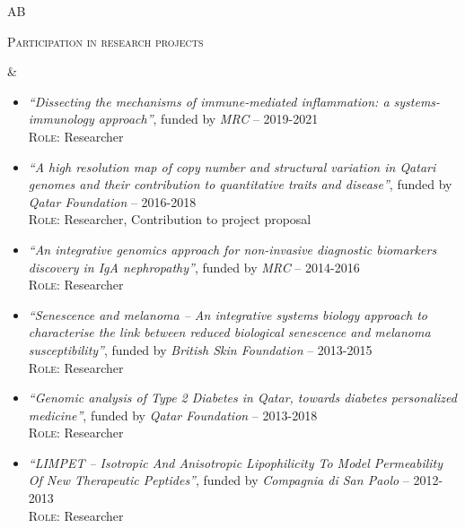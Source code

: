 \documentclass[a4paper,10pt]{article}
\newenvironment{doubletablelist}
{
	\vspace{-0.2cm}
	\begin{longtable}[!h]{AB}}{\end{longtable}
}
\newcommand{\dtlist}[2]{
\hspace{-3cm}
\noindent
	\begin{minipage}{0.24\textwidth}
	\begin{flushright}
	\textsc{#1}
	\end{flushright}
	\end{minipage}
	& #2\\[0.2cm]
}
\newcommand{\minusitem}{\item[-]}
\begin{document}
\begin{doubletablelist}
\dtlist{Participation in research projects}{
	\vspace{-0.8cm}
	\begin{itemize} %
		\minusitem  \begin{minipage}{0.65\textwidth}
			\emph{``Dissecting the mechanisms of immune-mediated inflammation: a systems-immunology approach''}, funded by \emph{MRC} -- 2019-2021\\
			\textsc{Role:} Researcher
		\end{minipage}
		
		\minusitem  \begin{minipage}{0.65\textwidth}
			\emph{``A high resolution map of copy number and structural variation in Qatari genomes and their contribution to quantitative traits and disease''}, funded by \emph{Qatar Foundation} -- 2016-2018\\
			\textsc{Role:} Researcher, Contribution to project proposal
		\end{minipage}
		
		\minusitem  \begin{minipage}{0.65\textwidth}
			\emph{``An integrative genomics approach for non-invasive diagnostic biomarkers discovery in IgA nephropathy''}, funded by \emph{MRC} -- 2014-2016\\
			\textsc{Role:} Researcher
		\end{minipage}
		
		\minusitem  \begin{minipage}{0.65\textwidth}
			\emph{``Senescence and melanoma -- An integrative systems biology approach to characterise the link between reduced biological senescence and melanoma susceptibility''}, funded by \emph{British Skin Foundation} -- 2013-2015\\
			\textsc{Role:} Researcher
		\end{minipage}
			
		\minusitem  \begin{minipage}{0.65\textwidth}
			\emph{``Genomic analysis of Type 2 Diabetes in Qatar, towards diabetes personalized medicine''}, funded by \emph{Qatar Foundation} -- 2013-2018\\
			\textsc{Role:} Researcher
		\end{minipage}
		
		\minusitem  \begin{minipage}{0.65\textwidth}
			\emph{``LIMPET -- Isotropic And Anisotropic Lipophilicity To Model Permeability Of New Therapeutic Peptides''}, funded by \emph{Compagnia di San Paolo} -- 2012-2013\\
			\textsc{Role:} Researcher
		\end{minipage}
		

\end{itemize}}
\end{doubletablelist}
\end{document}
